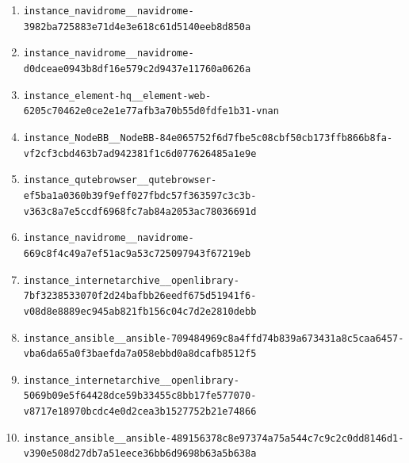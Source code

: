 \begin{enumerate}
\item \texttt{instance\_\allowbreak{}navidrome\_\allowbreak{}\_\allowbreak{}navidrome-\allowbreak{}3982ba725883e7\allowbreak{}1d4e3e618c61d5\allowbreak{}140eeb8d850a}
\item \texttt{instance\_\allowbreak{}navidrome\_\allowbreak{}\_\allowbreak{}navidrome-\allowbreak{}d0dceae0943b8d\allowbreak{}f16e579c2d9437\allowbreak{}e11760a0626a}
\item \texttt{instance\_\allowbreak{}element-\allowbreak{}hq\_\allowbreak{}\_\allowbreak{}element-\allowbreak{}web-\allowbreak{}6205c70462e0ce\allowbreak{}2e1e77afb3a70b\allowbreak{}55d0fdfe1b31-\allowbreak{}vnan}
\item \texttt{instance\_\allowbreak{}NodeBB\_\allowbreak{}\_\allowbreak{}NodeBB-\allowbreak{}84e065752f6d7f\allowbreak{}be5c08cbf50cb1\allowbreak{}73ffb866b8fa-\allowbreak{}vf2cf3cbd463b7\allowbreak{}ad942381f1c6d0\allowbreak{}77626485a1e9e}
\item \texttt{instance\_\allowbreak{}qutebrowser\_\allowbreak{}\_\allowbreak{}qutebrowser-\allowbreak{}ef5ba1a0360b39\allowbreak{}f9eff027fbdc57\allowbreak{}f363597c3c3b-\allowbreak{}v363c8a7e5ccdf\allowbreak{}6968fc7ab84a20\allowbreak{}53ac78036691d}
\item \texttt{instance\_\allowbreak{}navidrome\_\allowbreak{}\_\allowbreak{}navidrome-\allowbreak{}669c8f4c49a7ef\allowbreak{}51ac9a53c72509\allowbreak{}7943f67219eb}
\item \texttt{instance\_\allowbreak{}internetarchiv\allowbreak{}e\_\allowbreak{}\_\allowbreak{}openlibrary-\allowbreak{}7bf3238533070f\allowbreak{}2d24bafbb26eed\allowbreak{}f675d51941f6-\allowbreak{}v08d8e8889ec94\allowbreak{}5ab821fb156c04\allowbreak{}c7d2e2810debb}
\item \texttt{instance\_\allowbreak{}ansible\_\allowbreak{}\_\allowbreak{}ansible-\allowbreak{}709484969c8a4f\allowbreak{}fd74b839a67343\allowbreak{}1a8c5caa6457-\allowbreak{}vba6da65a0f3ba\allowbreak{}efda7a058ebbd0\allowbreak{}a8dcafb8512f5}
\item \texttt{instance\_\allowbreak{}internetarchiv\allowbreak{}e\_\allowbreak{}\_\allowbreak{}openlibrary-\allowbreak{}5069b09e5f6442\allowbreak{}8dce59b33455c8\allowbreak{}bb17fe577070-\allowbreak{}v8717e18970bcd\allowbreak{}c4e0d2cea3b152\allowbreak{}7752b21e74866}
\item \texttt{instance\_\allowbreak{}ansible\_\allowbreak{}\_\allowbreak{}ansible-\allowbreak{}489156378c8e97\allowbreak{}374a75a544c7c9\allowbreak{}c2c0dd8146d1-\allowbreak{}v390e508d27db7\allowbreak{}a51eece36bb6d9\allowbreak{}698b63a5b638a}

\end{enumerate}
